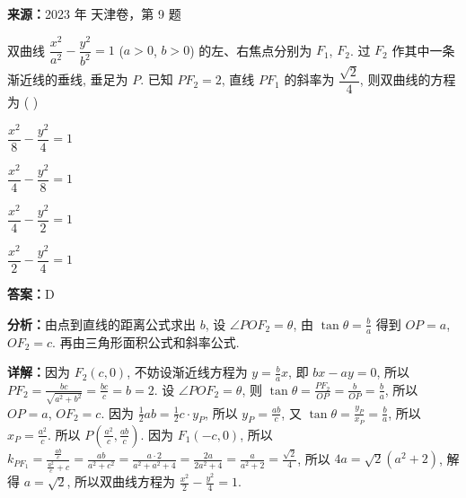 \begin{question}[points=5]
\textbf{来源：}2023 年 天津卷，第 9 题\par
双曲线 $\dfrac{x^2}{a^2} - \dfrac{y^2}{b^2} = 1$ ($a > 0$, $b > 0$) 的左、右焦点分别为 $F_1$, $F_2$. 过 $F_2$ 作其中一条渐近线的垂线, 垂足为 $P$. 已知 $PF_2 = 2$, 直线 $PF_1$ 的斜率为 $\dfrac{\sqrt{2}}{4}$, 则双曲线的方程为 ( )
\begin{choices}
  \item $\dfrac{x^2}{8} - \dfrac{y^2}{4} = 1$
  \item $\dfrac{x^2}{4} - \dfrac{y^2}{8} = 1$
  \item $\dfrac{x^2}{4} - \dfrac{y^2}{2} = 1$
  \item $\dfrac{x^2}{2} - \dfrac{y^2}{4} = 1$
\end{choices}
\begin{solution}
\textbf{答案：}D

\textbf{分析：}由点到直线的距离公式求出 $b$, 设 $\angle POF_2 = \theta$, 由 $\tan \theta = \frac{b}{a}$ 得到 $OP = a$, $OF_2 = c$. 再由三角形面积公式和斜率公式.

\textbf{详解：}因为 $F_2(c,0)$, 不妨设渐近线方程为 $y = \frac{b}{a}x$, 即 $bx - ay = 0$, 所以 $PF_2 = \frac{bc}{\sqrt{a^2 + b^2}} = \frac{bc}{c} = b = 2$. 设 $\angle POF_2 = \theta$, 则 $\tan \theta = \frac{PF_2}{OP} = \frac{b}{OP} = \frac{b}{a}$, 所以 $OP = a$, $OF_2 = c$. 因为 $\frac{1}{2}ab = \frac{1}{2}c \cdot y_P$, 所以 $y_P = \frac{ab}{c}$, 又 $\tan \theta = \frac{y_P}{x_P} = \frac{b}{a}$, 所以 $x_P = \frac{a^2}{c}$. 所以 $P\left(\frac{a^2}{c}, \frac{ab}{c}\right)$. 因为 $F_1(-c,0)$, 所以 $k_{PF_1} = \frac{\frac{ab}{c}}{\frac{a^2}{c} + c} = \frac{ab}{a^2 + c^2} = \frac{a \cdot 2}{a^2 + a^2 + 4} = \frac{2a}{2a^2 + 4} = \frac{a}{a^2 + 2} = \frac{\sqrt{2}}{4}$, 所以 $4a = \sqrt{2}(a^2 + 2)$, 解得 $a = \sqrt{2}$, 所以双曲线方程为 $\frac{x^2}{2} - \frac{y^2}{4} = 1$.
\end{solution}
\end{question}

